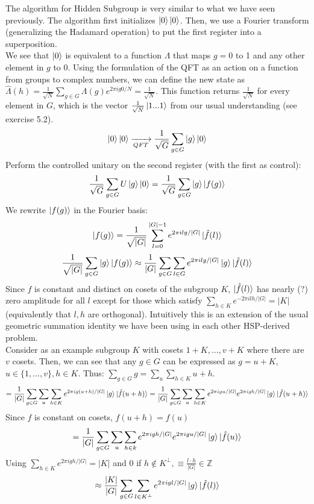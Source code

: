 \documentclass{article}
\begin{document}
The algorithm for Hidden Subgroup is very similar to what we have seen previously.
The algorithm first initializes $\ket{0}\ket{0}$. Then, we use a Fourier transform (generalizing the Hadamard operation) to put the first register into a superposition.\\
We see that $\ket{0}$ is equivalent to a function $\Lambda$ that maps $g=0$ to 1 and any other element in $g$ to $0$. Using the formulation of the QFT as an action on a function from groups to complex numbers, we can define the new state as $\hat{\Lambda}(h) = \frac{1}{\sqrt{N}} \sum_{g \in G} \Lambda(g) e^{2\pi i g 0/ N} = \frac{1}{\sqrt{N}}$. This function returns $\frac{1}{\sqrt{N}}$ for every element in $G$, which is the vector $\frac{1}{\sqrt{N}}\ket{1...1}$ from our usual understanding (see exercise 5.2). 
$$\ket{0}\ket{0} \xrightarrow[QFT]{}  \frac{1}{\sqrt{G}} \sum_{g \in G}\ket{g} \ket{0} $$
Perform the controlled unitary on the second register (with the first as control):
$$\frac{1}{\sqrt{G}}\sum_{g \in G} U\ket{g} \ket{0} =  \frac{1}{\sqrt{G}}\sum_{g \in G}\ket{g} \ket{f(g)} $$
We rewrite $\ket{f(g)}$ in the Fourier basis:
$$\ket{f(g)} = \frac{1}{\sqrt{|G|}} \sum_{l=0}^{|G|-1} e^{2\pi i lg/|G|} \ket{\hat{f}(l)}$$
$$\frac{1}{\sqrt{|G|}}\sum_{g\in G} \ket{g}\ket{f(g)} \approx \frac{1}{|G|} \sum_{g \in G}\sum_{l \in G} e^{2 \pi i lg/ |G|}\ket{g} \ket{\hat{f}(l)}$$
Since $f$ is constant and distinct on cosets of the subgroup $K$, $\ket{\hat{f}(l)}$ has nearly (?) zero amplitude for all $l$ except for those which satisfy $\sum_{h \in K} e^{-2\pi i lh/ |G|} = |K|$ (equivalently that $l,h$ are orthogonal). Intuitively this is an extension of the usual geometric summation identity we have been using in each other HSP-derived problem.\\
Consider as an example subgroup $K$ with cosets $1+K, \dots, v + K$ where there are $v$ cosets. Then, we can see that any $g \in G$ can be expressed as $g = u + K$, $u \in \{ 1, \dots, v\}, h \in K$. Thus: $\sum_{g \in G} g = \sum_{u}\sum_{h \in K} u + h$.
$$  =\frac{1}{|G|} \sum_{g \in G}\sum_{u} \sum_{h \in K} e^{2 \pi i g (u+h)/ |G|}\ket{g} \ket{\hat{f}(u+h)} = \frac{1}{|G|} \sum_{g \in G}\sum_{u} \sum_{h \in K} e^{2 \pi i g u/ |G|} e^{2 \pi i g h/ |G|}\ket{g} \ket{\hat{f}(u+h)}$$
Since $f$ is constant on cosets, $f(u+h) = f(u)$
$$= \frac{1}{|G|}\sum_{g \in G} \sum_{u} \sum_{h\in k} e^{2\pi i gh/|G| }e^{2\pi i gu/|G|} \ket{g}\ket{\hat{f}(u)}$$
Using $\sum_{h\in K} e^{2\pi i gh/ |G|} = |K|$ and 0 if $h \not \in K^\perp, \equiv \frac{l \cdot h}{|G|} \in \mathbb{Z}$
$$\approx \frac{|K|}{|G|} \sum_{g \in G} \sum_{l \in K^\perp} e^{2\pi igl/ |G|} \ket{g}\ket{\hat{f}(l)}$$
\end{document}
